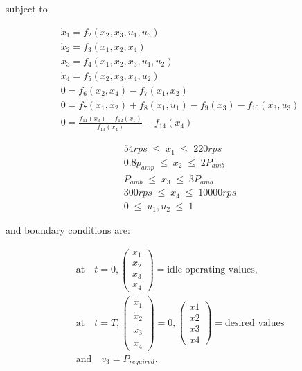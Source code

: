 subject to

\begin{equation*}
	\begin{aligned}
		\dot{x}_1 = f_2 (x_2,x_3,u_1,u_3 ) \\
		\dot{x}_2= f_3 (x_1,x_2,x_4 ) \\
		\dot{x}_3=f_4 (x_1,x_2,x_3,u_1,u_2 ) \\
		\dot{x}_4=f_5 (x_2,x_3,x_4,u_2 ) \\
		0= f_6 (x_2,x_4 )- f_7 (x_1,x_2 ) \\
		0= f_7(x_1,x_2 ) + f_8 (x_1,u_1 )-f_9 (x_3 )-f_{10}(x_3,u_3 )  \\
		0= \frac{f_{11}(x_3)-f_{12}(x_1 )} {f_{13}(x_4 )}-f_{14} (x_4 )
\end{aligned}
\end{equation*}

\begin{equation*}
	\begin{aligned}
      54 rps \;\leq  \;  x_1  \;\leq \; 220 rps \\
      0.8 p_{amp} \;\leq \;  x_2 \; \leq \; 2P_{amb} \\
      P_{amb} \;  \leq\; x_3 \;\leq \;  3P_{amb} \\
      300rps  \; \leq \; x_4 \;\leq \;   10000 rps \\
      0 \;\leq \;u_1,u_2 \;\leq \; 1
	\end{aligned}
\end{equation*}

and boundary conditions are:

\begin{equation*}
 \begin{aligned}
	\text{at}\quad t = 0,  \begin{pmatrix} x_1 \\ x_2 \\x_3 \\x_4  \end{pmatrix} = \text{idle operating values,} \\
	\text{at}\quad t = T,  \begin{pmatrix} \dot{x}_1 \\ \dot{x}_2 \\\dot{x}_3\\\dot{x}_4 \end{pmatrix} = 0,  \begin{pmatrix} x1 \\ x2 \\x3 \\x4  \end{pmatrix} = \text{desired values} \\
	\text{and}\quad v_3 = P_{required}.
 \end{aligned}
\end{equation*}


